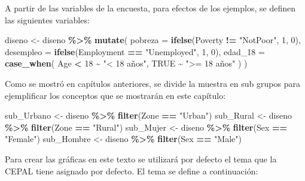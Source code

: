 \documentclass[
  spanish,
  12pt,
]{book}
\newenvironment{Shaded}{\begin{snugshade}}{\end{snugshade}}
\newcommand{\AttributeTok}[1]{\textcolor[rgb]{0.13,0.29,0.53}{#1}}
\newcommand{\ConstantTok}[1]{\textcolor[rgb]{0.56,0.35,0.01}{#1}}
\newcommand{\DecValTok}[1]{\textcolor[rgb]{0.00,0.00,0.81}{#1}}
\newcommand{\FunctionTok}[1]{\textcolor[rgb]{0.13,0.29,0.53}{\textbf{#1}}}
\newcommand{\NormalTok}[1]{#1}
\newcommand{\OtherTok}[1]{\textcolor[rgb]{0.56,0.35,0.01}{#1}}
\newcommand{\SpecialCharTok}[1]{\textcolor[rgb]{0.81,0.36,0.00}{\textbf{#1}}}
\newcommand{\StringTok}[1]{\textcolor[rgb]{0.31,0.60,0.02}{#1}}
\begin{document}
A partir de las variables de la encuesta, para efectos de los ejemplos, se definen las siguientes variables:

\begin{Shaded}
\begin{Highlighting}[]
\NormalTok{diseno }\OtherTok{\textless{}{-}}\NormalTok{ diseno }\SpecialCharTok{\%\textgreater{}\%} \FunctionTok{mutate}\NormalTok{(}
  \AttributeTok{pobreza =} \FunctionTok{ifelse}\NormalTok{(Poverty }\SpecialCharTok{!=} \StringTok{"NotPoor"}\NormalTok{, }\DecValTok{1}\NormalTok{, }\DecValTok{0}\NormalTok{),}
  \AttributeTok{desempleo =} \FunctionTok{ifelse}\NormalTok{(Employment }\SpecialCharTok{==} \StringTok{"Unemployed"}\NormalTok{, }\DecValTok{1}\NormalTok{, }\DecValTok{0}\NormalTok{),}
  \AttributeTok{edad\_18 =} \FunctionTok{case\_when}\NormalTok{(}
\NormalTok{    Age }\SpecialCharTok{\textless{}} \DecValTok{18} \SpecialCharTok{\textasciitilde{}} \StringTok{"\textless{} 18 años"}\NormalTok{,}
    \ConstantTok{TRUE} \SpecialCharTok{\textasciitilde{}} \StringTok{"\textgreater{}= 18 años"}
\NormalTok{  )}
\NormalTok{)}
\end{Highlighting}
\end{Shaded}

Como se mostró en capítulos anteriores, se divide la muestra en sub grupos para ejemplificar los conceptos que se mostrarán en este capítulo:

\begin{Shaded}
\begin{Highlighting}[]
\NormalTok{sub\_Urbano }\OtherTok{\textless{}{-}}\NormalTok{ diseno }\SpecialCharTok{\%\textgreater{}\%} \FunctionTok{filter}\NormalTok{(Zone }\SpecialCharTok{==} \StringTok{"Urban"}\NormalTok{)}
\NormalTok{sub\_Rural }\OtherTok{\textless{}{-}}\NormalTok{ diseno }\SpecialCharTok{\%\textgreater{}\%} \FunctionTok{filter}\NormalTok{(Zone }\SpecialCharTok{==} \StringTok{"Rural"}\NormalTok{)}
\NormalTok{sub\_Mujer }\OtherTok{\textless{}{-}}\NormalTok{ diseno }\SpecialCharTok{\%\textgreater{}\%} \FunctionTok{filter}\NormalTok{(Sex }\SpecialCharTok{==} \StringTok{"Female"}\NormalTok{)}
\NormalTok{sub\_Hombre }\OtherTok{\textless{}{-}}\NormalTok{ diseno }\SpecialCharTok{\%\textgreater{}\%} \FunctionTok{filter}\NormalTok{(Sex }\SpecialCharTok{==} \StringTok{"Male"}\NormalTok{)}
\end{Highlighting}
\end{Shaded}

Para crear las gráficas en este texto se utilizará por defecto el tema que la CEPAL tiene asignado por defecto. El tema se define a continuación:
\end{document}

